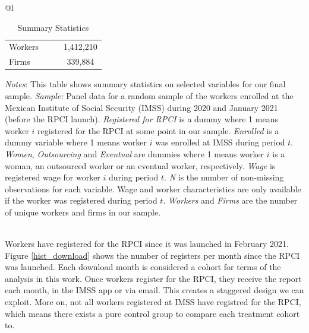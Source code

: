 \documentclass[10pt, oneside]{book}
\begin{document}
\begin{table}[H]
\footnotesize
\centering
\begin{threeparttable}
\centering
\caption{Summary Statistics\label{tab:summary_stats_rpci}}

\begin{tabular}[t]{@{}l}
\toprule
\toprule
\begin{tabular}[t]{lccc}

\midrule
Workers & & & 1,412,210\\
Firms & & & 339,884\\
\end{tabular}

\tabularnewline 
\bottomrule
\bottomrule

\end{tabular}

\begin{tablenotes}
\setlength{}
\scriptsize
\item \textit{Notes}: This table shows summary statistics on selected variables for our final sample. \textit{Sample:} Panel data for a random sample of the workers enrolled at the Mexican Institute of Social Security (IMSS) during 2020 and January 2021 (before the RPCI launch). \textit{Registered for RPCI} is a dummy where 1 means worker $i$ registered for the RPCI at some point in our sample. \textit{Enrolled} is a dummy variable where 1 means worker $i$ was enrolled at IMSS during period $t$. \textit{Women}, \textit{Outsourcing} and \textit{Eventual} are dummies where 1 means worker $i$ is a woman, an outsourced worker or an eventual worker, respectively. \textit{Wage} is registered wage for worker $i$ during period $t$. \textit{N} is the number of non-missing observations for each variable. Wage and worker characteristics are only available if the worker was registered during period $t$. \textit{Workers} and \textit{Firms} are the number of unique workers and firms in our sample. %
\end{tablenotes}
\end{threeparttable}
\end{table} \\

Workers have registered for the RPCI since it was launched in February 2021. Figure \ref{hist_download} shows the number of registers per month since the RPCI was launched. Each download month is considered a cohort for terms of the analysis in this work. Once workers register for the RPCI, they receive the report each month, in the IMSS app or via email. This creates a staggered design we can exploit. More on, not all workers registered at IMSS have registred for the RPCI, which means there exists a pure control group to compare each treatment cohort to. 
\end{document}
